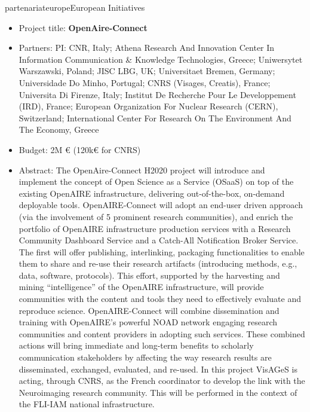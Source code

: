 \documentclass{ra2018}
\begin{document}
\begin{module}{partenariat}{europe}{European Initiatives}
\begin{itemize}
        \item Project title: \textbf{OpenAire-Connect}
        \item Partners: PI: CNR, Italy; Athena Research And Innovation Center In Information Communication \& Knowledge Technologies, Greece; Uniwersytet Warszawski, Poland; JISC LBG, UK; Universitaet Bremen, Germany; Universidade Do Minho, Portugal; CNRS (Visages, Creatis), France; Universita Di Firenze, Italy; Institut De Recherche Pour Le Developpement (IRD), France; European Organization For Nuclear Research (CERN), Switzerland; International Center For Research On The Environment And The Economy, Greece
        \item Budget: 2M € (120k€ for CNRS)
        \item Abstract:  The OpenAire-Connect H2020 project will introduce and implement the concept of Open Science as a Service (OSaaS) on top of the existing OpenAIRE infrastructure, delivering out-of-the-box, on-demand deployable tools. OpenAIRE-Connect will adopt an end-user driven approach (via the involvement of 5 prominent research communities), and enrich the portfolio of OpenAIRE infrastructure production services with a Research Community Dashboard Service and a Catch-All Notification Broker Service. The first will offer publishing, interlinking, packaging functionalities to enable them to share and re-use their research artifacts (introducing methods, e.g., data, software, protocols). This effort, supported by the harvesting and mining “intelligence” of the OpenAIRE infrastructure, will provide communities with the content and tools they need to effectively evaluate and reproduce science. OpenAIRE-Connect will combine dissemination and training with OpenAIRE's powerful NOAD network engaging research communities and content providers in adopting such services. These combined actions will bring immediate and long-term benefits to scholarly communication stakeholders by affecting the way research results are disseminated, exchanged, evaluated, and re-used. In this project VisAGeS is acting, through CNRS, as the French coordinator to develop the link with the Neuroimaging research community. This will be performed in the context of the FLI-IAM national infrastructure.
\end{itemize}


\end{module}
\end{document}
